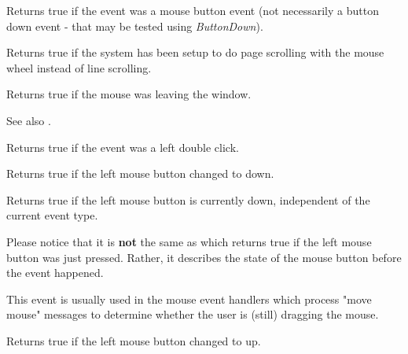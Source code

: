 
Returns true if the event was a mouse button event (not necessarily a button down event -
that may be tested using {\it ButtonDown}).


\label{wxmouseeventispagescroll}


Returns true if the system has been setup to do page scrolling with
the mouse wheel instead of line scrolling.


\label{wxmouseeventleaving}


Returns true if the mouse was leaving the window.

See also .


\label{wxmouseeventleftdclick}


Returns true if the event was a left double click.


\label{wxmouseeventleftdown}


Returns true if the left mouse button changed to down.


\label{wxmouseeventleftisdown}


Returns true if the left mouse button is currently down, independent
of the current event type.

Please notice that it is {\bf not} the same as
 which returns true if the left mouse
button was just pressed. Rather, it describes the state of the mouse button
before the event happened.

This event is usually used in the mouse event handlers which process "move
mouse" messages to determine whether the user is (still) dragging the mouse.


\label{wxmouseeventleftup}


Returns true if the left mouse button changed to up.


